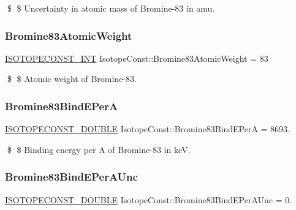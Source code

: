 \$ \$ Uncertainty in atomic mass of Bromine-\/83 in amu. \mbox{\label{group___isotope_const-_bromine-_br83_ga94c3d9e4993473183cd7ac182e878cd3}} 
\subsubsection{\texorpdfstring{Bromine83\+Atomic\+Weight}{Bromine83AtomicWeight}}
{\footnotesize\ttfamily \mbox{\hyperlink{group___isotope_const-_macros_ga5f18360b3e99483a35c32d789e62621c}{I\+S\+O\+T\+O\+P\+E\+C\+O\+N\+S\+T\+\_\+\+I\+NT}} Isotope\+Const\+::\+Bromine83\+Atomic\+Weight = 83}

\$ \$ Atomic weight of Bromine-\/83. \mbox{\label{group___isotope_const-_bromine-_br83_ga1670e6961115fedb3ffb87b2a885b216}} 
\subsubsection{\texorpdfstring{Bromine83\+Bind\+E\+PerA}{Bromine83BindEPerA}}
{\footnotesize\ttfamily \mbox{\hyperlink{group___isotope_const-_macros_ga8f45a7272ce02c0b4c65c44636ed719a}{I\+S\+O\+T\+O\+P\+E\+C\+O\+N\+S\+T\+\_\+\+D\+O\+U\+B\+LE}} Isotope\+Const\+::\+Bromine83\+Bind\+E\+PerA = 8693.}

\$ \$ Binding energy per A of Bromine-\/83 in keV. \mbox{\label{group___isotope_const-_bromine-_br83_ga4dd2349e64dc0ba281765b1e19ec346b}} 
\subsubsection{\texorpdfstring{Bromine83\+Bind\+E\+Per\+A\+Unc}{Bromine83BindEPerAUnc}}
{\footnotesize\ttfamily \mbox{\hyperlink{group___isotope_const-_macros_ga8f45a7272ce02c0b4c65c44636ed719a}{I\+S\+O\+T\+O\+P\+E\+C\+O\+N\+S\+T\+\_\+\+D\+O\+U\+B\+LE}} Isotope\+Const\+::\+Bromine83\+Bind\+E\+Per\+A\+Unc = 0.}

